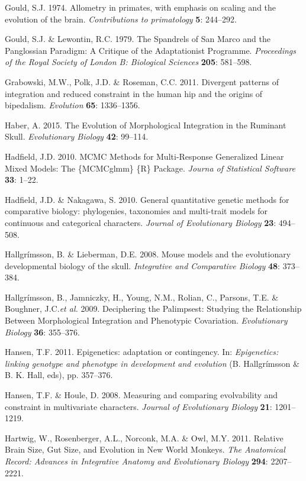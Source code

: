 \documentclass[12pt,twoside]{report}
\begin{document}
Gould, S.J. 1974. Allometry in primates, with emphasis on scaling and
the evolution of the brain. \emph{Contributions to primatology}
\textbf{5}: 244--292.

Gould, S.J. \& Lewontin, R.C. 1979. The Spandrels of San Marco and the
Panglossian Paradigm: A Critique of the Adaptationist Programme.
\emph{Proceedings of the Royal Society of London B: Biological Sciences}
\textbf{205}: 581--598.

Grabowski, M.W., Polk, J.D. \& Roseman, C.C. 2011. Divergent patterns of
integration and reduced constraint in the human hip and the origins of
bipedalism. \emph{Evolution} \textbf{65}: 1336--1356.

Haber, A. 2015. The Evolution of Morphological Integration in the
Ruminant Skull. \emph{Evolutionary Biology} \textbf{42}: 99--114.

Hadfield, J.D. 2010. MCMC Methods for Multi-Response Generalized Linear
Mixed Models: The \{MCMCglmm\} \{R\} Package. \emph{Journa of
Statistical Software} \textbf{33}: 1--22.

Hadfield, J.D. \& Nakagawa, S. 2010. General quantitative genetic
methods for comparative biology: phylogenies, taxonomies and multi-trait
models for continuous and categorical characters. \emph{Journal of
Evolutionary Biology} \textbf{23}: 494--508.

Hallgrímsson, B. \& Lieberman, D.E. 2008. Mouse models and the
evolutionary developmental biology of the skull. \emph{Integrative and
Comparative Biology} \textbf{48}: 373--384.

Hallgrímsson, B., Jamniczky, H., Young, N.M., Rolian, C., Parsons, T.E.
\& Boughner, J.C.\emph{et al.} 2009. Deciphering the Palimpsest:
Studying the Relationship Between Morphological Integration and
Phenotypic Covariation. \emph{Evolutionary Biology} \textbf{36}:
355--376.

Hansen, T.F. 2011. Epigenetics: adaptation or contingency. In:
\emph{Epigenetics: linking genotype and phenotype in development and
evolution} (B. Hallgrímsson \& B. K. Hall, eds), pp. 357--376.

Hansen, T.F. \& Houle, D. 2008. Measuring and comparing evolvability and
constraint in multivariate characters. \emph{Journal of Evolutionary
Biology} \textbf{21}: 1201--1219.

Hartwig, W., Rosenberger, A.L., Norconk, M.A. \& Owl, M.Y. 2011.
Relative Brain Size, Gut Size, and Evolution in New World Monkeys.
\emph{The Anatomical Record: Advances in Integrative Anatomy and
Evolutionary Biology} \textbf{294}: 2207--2221.
\end{document}

